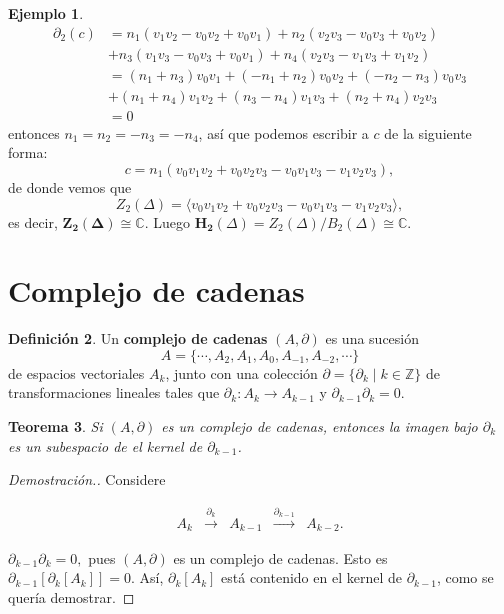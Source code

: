 \documentclass[12pt]{book}
\newtheorem{theorem}{Teorema}[section]
\theoremstyle{definition}
\newtheorem{definition}[theorem]{Definición}
\newtheorem{example}[theorem]{Ejemplo}
\newcounter{in}
\newcounter{ini}
\begin{document}
\begin{example}
\begin{align*}
   \partial_{2}(c)&=n_{1}(v_{1}v_{2}-v_{0}v_{2}+v_{0}v_{1})+n_{2}(v_{2}v_{3}-v_{0}v_{3}+v_{0}v_{2})\\
   &+n_{3}(v_{1}v_{3}-v_{0}v_{3}+v_{0}v_{1})+n_{4}(v_{2}v_{3}-v_{1}v_{3}+v_{1}v_{2})\\
   &=(n_{1}+n_{3})v_{0}v_{1}+(-n_{1}+n_{2})v_{0}v_{2}+(-n_{2}-n_{3})v_{0}v_{3}\\
   & +(n_{1}+n_{4})v_{1}v_{2}+(n_{3}-n_{4})v_{1}v_{3}+(n_{2}+n_{4})v_{2}v_{3}\\
   &=0
 \end{align*}
 entonces $n_{1}=n_{2}=-n_{3}=-n_{4}$, así que podemos escribir a $c$
 de la siguiente forma: 
 $$c=n_{1}(v_{0}v_{1}v_{2}+v_{0}v_{2}v_{3}-v_{0}v_{1}v_{3}-v_{1}v_{2}v_{3}),$$
 de donde vemos que
 $$Z_{2}(\Delta)=\langle v_{0}v_{1}v_{2}+v_{0}v_{2}v_{3}-v_{0}v_{1}v_{3}-v_{1}v_{2}v_{3}\rangle,$$
 es decir, $\boldsymbol{Z_{2}(\Delta)}\cong \mathbb{C}$. Luego  $\boldsymbol{H_{2}}(\Delta)=Z_{2}(\Delta)/B_{2}(\Delta)\cong\mathbb{C}$.
\end{example}

\section{Complejo de cadenas}
\label{com-cad}

\begin{definition}
  Un \textbf{complejo de cadenas} $(A,\partial)$ es una sucesión
  $$A=\{\cdots,A_{2},A_{1},A_{0},A_{-1},A_{-2},\cdots\}$$
  de espacios vectoriales $A_{k}$, junto con una colección
  $\partial=\{\partial_{k}\mid k \in \mathbb{Z}\}$ de transformaciones
  lineales tales que $\partial_{k}:A_{k}\rightarrow A_{k-1}$ y
  $\partial_{k-1}\partial_{k}=0.$
\end{definition}

\begin{theorem}
  Si $(A,\partial)$ es un complejo de cadenas, entonces la imagen bajo
  $\partial_{k}$ es un subespacio de el kernel de $\partial_{k-1}$.
\end{theorem}
\begin{proof}[Demostración.]
  Considere
  \begin{small}
    \[
    \begin{array}{ccccc}
      A_{k} & \stackrel{\partial_{k}}{\longrightarrow} & A_{k-1} &
      \stackrel{\partial_{k-1}}{\longrightarrow} & A_{k-2}.
    \end{array} 
    \]
  \end{small}
  $\partial_{k-1}\partial_{k}=0,$ pues $(A,\partial)$ es un complejo
  de cadenas. Esto es $\partial_{k-1}[\partial_{k}[A_{k}]]=0.$ Así,
  $\partial_{k}[A_{k}]$ está contenido en el kernel de
  $\partial_{k-1}$, como se quería demostrar.
\end{proof}
\end{document}
